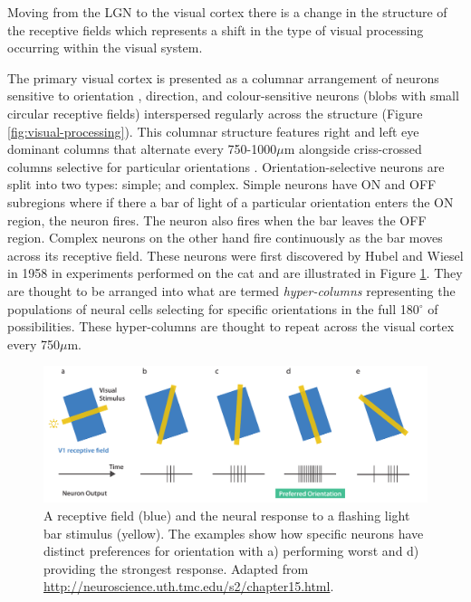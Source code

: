 Moving from the LGN to the visual cortex there is a change in the structure of the receptive fields which represents a shift in the type of visual processing occurring within the visual system.  

The primary visual cortex is presented as a columnar arrangement of neurons sensitive to orientation \cite{hubel1959receptive}, direction, and colour-sensitive neurons (blobs with small circular receptive fields) \cite{horwitz2012nonlinear} interspersed regularly across the structure (Figure \ref{fig:visual-processing}). 
This columnar structure features right and left eye dominant columns that alternate every 750-1000$\mu$m alongside criss-crossed columns selective for particular orientations \cite{horton1984mapping}. 
Orientation-selective neurons are split into two types: simple; and complex. 
Simple neurons have ON and OFF subregions where if there a bar of light of a particular orientation enters the ON region, the neuron fires. 
The neuron also fires when the bar leaves the OFF region. 
Complex neurons on the other hand fire continuously as the bar moves across its receptive field. 
These neurons were first discovered by Hubel and Wiesel in 1958 in experiments performed on the cat \cite{hubel1959receptive} and are illustrated in Figure \ref{fig:orientation-cells}. 
They are thought to be arranged into what are termed \emph{hyper-columns} representing the populations of neural cells selecting for specific orientations in the full 180$^{\circ}$ of possibilities. 
These hyper-columns are thought to repeat across the visual cortex every 750$\mu$m.

\begin{figure}[t!]
\centering
\includegraphics[width=\textwidth]{images/related-work/orientation.pdf}
\caption{A receptive field (blue) and the neural response to a flashing light bar stimulus (yellow). 
The examples show how specific neurons have distinct preferences for orientation with a) performing worst and d) providing the strongest response. 
Adapted from \url{http://neuroscience.uth.tmc.edu/s2/chapter15.html}.}
\label{fig:orientation-cells}
\end{figure}

